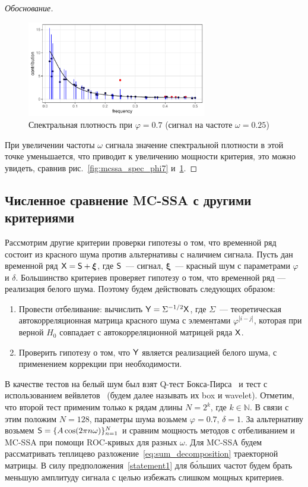 \documentclass[specialist,
substylefile = spbu.rtx,
               subf,href,colorlinks=true,12pt]{disser}
\theoremstyle{definition}
\newcommand{\bfxi}{\boldsymbol{\xi}}
\begin{document}
\begin{proof}[Обоснование]
\begin{figure}[h]
	\end{figure}
	\begin{figure}[H]
		\centering
		\includegraphics[width=0.7\textwidth]{img/mcssa_spec_phi7_omega025.pdf}
		\caption{Спектральная плотность при $\varphi=0.7$ (сигнал на частоте $\omega=0.25$)}
		\label{fig:mcssa_spec_phi7_omega025}
	\end{figure}
	При увеличении частоты $\omega$ сигнала значение спектральной плотности в этой точке уменьшается, что приводит к увеличению мощности критерия, это можно увидеть, сравнив рис.~\ref{fig:mcssa_spec_phi7} и~\ref{fig:mcssa_spec_phi7_omega025}.
\end{proof}

\subsection{Численное сравнение MC-SSA с другими критериями}\label{sect:mc-ssa_comparison}
Рассмотрим другие критерии проверки гипотезы о том, что временной ряд состоит из красного шума против альтернативы с наличием сигнала. Пусть дан временной ряд $\tX=\tS+\bfxi$, где $\mathsf{S}$~--- сигнал, $\bfxi$~--- красный шум с параметрами $\varphi$ и $\delta$. Большинство критериев проверяет гипотезу о том, что временной ряд --- реализация белого шума. Поэтому будем действовать следующих образом:
\begin{enumerate}
	\item Провести отбеливание: вычислить $\mathsf{Y}=\Sigma^{-1/2}\mathsf{X}$, где $\Sigma$~--- теоретическая автокорреляционная матрица красного шума с элементами $\varphi^{|i-j|}$, которая при верной $H_0$ совпадает с автокорреляционной матрицей ряда $\mathsf{X}$.
	\item Проверить гипотезу о том, что $\mathsf{Y}$ является реализацией белого шума, с применением коррекции при необходимости.
\end{enumerate}
В качестве тестов на белый шум был взят Q-тест Бокса-Пирса~\cite{Box1970} и тест с использованием вейвлетов~\cite{Nason2014} (будем далее называть их box и wavelet). Отметим, что второй тест применим только к рядам длины $N=2^k$, где $k\in\mathbb{N}$. В связи с этим положим $N=128$, параметры шума возьмем $\varphi=0.7$, $\delta=1$. За альтернативу возьмем $\mathsf{S}=\{A\cos(2\pi n\omega)\}_{n=1}^N$ и сравним мощность методов с отбеливанием и MC-SSA при помощи ROC-кривых для разных $\omega$. Для MC-SSA будем рассматривать теплицево разложение~\eqref{eq:sum_decomposition} траекторной матрицы. В силу предположения~\ref{statement1} для б\'{о}льших частот будем брать меньшую амплитуду сигнала с целью избежать слишком мощных критериев.
\end{document}

